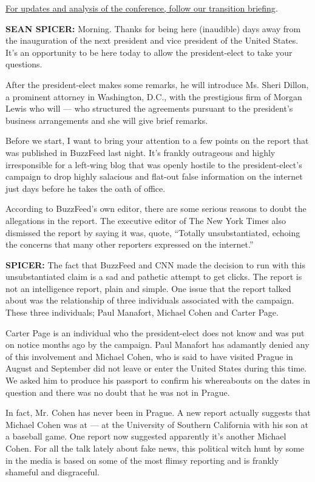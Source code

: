 \href{https://www.nytimes.com/2017/01/11/us/politics/donald-trump-press-conference.html}{For
updates and analysis of the conference, follow our transition briefing}.

\textbf{SEAN SPICER:} Morning. Thanks for being here (inaudible) days
away from the inauguration of the next president and vice president of
the United States. It's an opportunity to be here today to allow the
president-elect to take your questions.

After the president-elect makes some remarks, he will introduce Ms.
Sheri Dillon, a prominent attorney in Washington, D.C., with the
prestigious firm of Morgan Lewis who will --- who structured the
agreements pursuant to the president's business arrangements and she
will give brief remarks.

Before we start, I want to bring your attention to a few points on the
report that was published in BuzzFeed last night. It's frankly
outrageous and highly irresponsible for a left-wing blog that was openly
hostile to the president-elect's campaign to drop highly salacious and
flat-out false information on the internet just days before he takes the
oath of office.

According to BuzzFeed's own editor, there are some serious reasons to
doubt the allegations in the report. The executive editor of The New
York Times also dismissed the report by saying it was, quote, ``Totally
unsubstantiated, echoing the concerns that many other reporters
expressed on the internet.''

\textbf{SPICER:} The fact that BuzzFeed and CNN made the decision to run
with this unsubstantiated claim is a sad and pathetic attempt to get
clicks. The report is not an intelligence report, plain and simple. One
issue that the report talked about was the relationship of three
individuals associated with the campaign. These three individuals; Paul
Manafort, Michael Cohen and Carter Page.

Carter Page is an individual who the president-elect does not know and
was put on notice months ago by the campaign. Paul Manafort has
adamantly denied any of this involvement and Michael Cohen, who is said
to have visited Prague in August and September did not leave or enter
the United States during this time. We asked him to produce his passport
to confirm his whereabouts on the dates in question and there was no
doubt that he was not in Prague.

In fact, Mr. Cohen has never been in Prague. A new report actually
suggests that Michael Cohen was at --- at the University of Southern
California with his son at a baseball game. One report now suggested
apparently it's another Michael Cohen. For all the talk lately about
fake news, this political witch hunt by some in the media is based on
some of the most flimsy reporting and is frankly shameful and
disgraceful.

